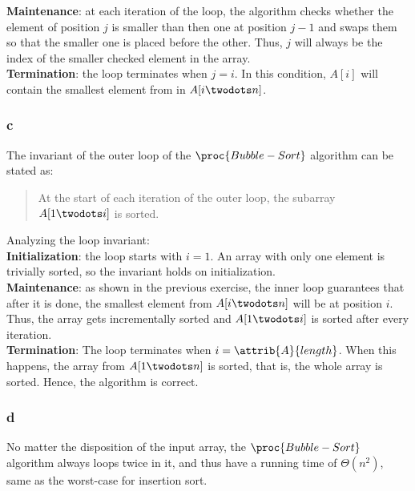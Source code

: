 \documentclass[8pt,a4paper]{article}
\begin{document}
\textbf{Maintenance}: at each iteration of the loop, the algorithm checks whether the
element of position $j$ is smaller than then one at position $j - 1$ and swaps them
so that the smaller one is placed before the other. Thus, $j$ will always be the index
of the smaller checked element in the array. \\

\textbf{Termination}: the loop terminates when $j = i$. In this condition, $A[i]$ will
contain the smallest element from in $A[i \twodots n]$.

\subsubsection*{c}

The invariant of the outer loop of the $\proc{Bubble-Sort}$ algorithm can be stated as:

\begin{quotation}
  At the start of each iteration of the outer \For loop, the subarray $A[1 \twodots i]$
  is sorted.
\end{quotation}

Analyzing the loop invariant: \\

\textbf{Initialization}: the loop starts with $i = 1$. An array with only one element
is trivially sorted, so the invariant holds on initialization. \\

\textbf{Maintenance}: as shown in the previous exercise, the inner loop guarantees
that after it is done, the smallest element from $A[i \twodots n]$ will be at position
$i$. Thus, the array gets incrementally sorted and $A[1 \twodots i]$ is sorted after
every iteration. \\

\textbf{Termination}: The loop terminates when $i = \attrib{A}{length}$. When this
happens, the array from $A[1 \twodots n]$ is sorted, that is, the whole array is
sorted. Hence, the algorithm is correct.

\subsubsection*{d}

No matter the disposition of the input array, the $\proc{Bubble-Sort}$ algorithm
always loops twice in it, and thus have a running time of $\Theta(n^{2})$, same
as the worst-case for insertion sort.
\end{document}
